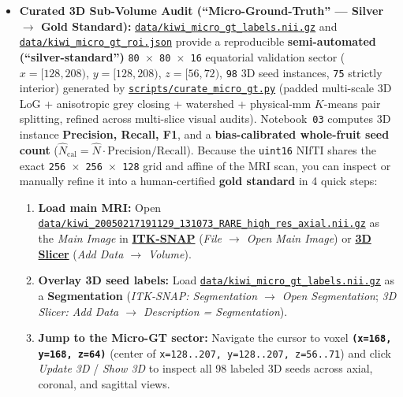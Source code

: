 \documentclass[10pt,a4paper]{article}
\newcommand{\ghblob}{https://github.com/arvidl/BMED365-2027/blob/main}
\begin{document}
\begin{itemize}
    \item \textbf{Curated 3D Sub-Volume Audit (``Micro-Ground-Truth'' --- Silver $\to$ Gold Standard):} \href{\ghblob/Lab4-Comp-Imag/Kiwi-challenge/data/kiwi_micro_gt_labels.nii.gz}{\nolinkurl{data/kiwi_micro_gt_labels.nii.gz}} and \href{\ghblob/Lab4-Comp-Imag/Kiwi-challenge/data/kiwi_micro_gt_roi.json}{\nolinkurl{data/kiwi_micro_gt_roi.json}} provide a reproducible \textbf{semi-automated (``silver-standard'')} \texttt{80 $\times$ 80 $\times$ 16} equatorial validation sector ($x=[128,208)$, $y=[128,208)$, $z=[56,72)$, \texttt{98} 3D seed instances, \texttt{75} strictly interior) generated by \href{\ghblob/Lab4-Comp-Imag/Kiwi-challenge/scripts/curate_micro_gt.py}{\nolinkurl{scripts/curate_micro_gt.py}} (padded multi-scale 3D LoG + anisotropic grey closing + watershed + physical-mm $K$-means pair splitting, refined across multi-slice visual audits). Notebook~\texttt{03} computes 3D instance \textbf{Precision, Recall, F1}, and a \textbf{bias-calibrated whole-fruit seed count} ($\hat{N}_{\text{cal}} = \hat{N} \cdot \text{Precision} / \text{Recall}$). Because the \texttt{uint16} NIfTI shares the exact \texttt{256 $\times$ 256 $\times$ 128} grid and affine of the MRI scan, you can inspect or manually refine it into a human-certified \textbf{gold standard} in 4 quick steps:
    \begin{enumerate}
        \item \textbf{Load main MRI:} Open \href{\ghblob/Lab4-Comp-Imag/Kiwi-challenge/data/kiwi_20050217191129_131073_RARE_high_res_axial.nii.gz}{\nolinkurl{data/kiwi_20050217191129_131073_RARE_high_res_axial.nii.gz}} as the \textit{Main Image} in \href{http://www.itksnap.org/}{\textbf{ITK-SNAP}} (\textit{File $\to$ Open Main Image}) or \href{https://www.slicer.org/}{\textbf{3D Slicer}} (\textit{Add Data $\to$ Volume}).
        \item \textbf{Overlay 3D seed labels:} Load \href{\ghblob/Lab4-Comp-Imag/Kiwi-challenge/data/kiwi_micro_gt_labels.nii.gz}{\nolinkurl{data/kiwi_micro_gt_labels.nii.gz}} as a \textbf{Segmentation} (\textit{ITK-SNAP: Segmentation $\to$ Open Segmentation}; \textit{3D Slicer: Add Data $\to$ Description = Segmentation}).
        \item \textbf{Jump to the Micro-GT sector:} Navigate the cursor to voxel \textbf{\texttt{(x=168, y=168, z=64)}} (center of \texttt{x=128..207, y=128..207, z=56..71}) and click \textit{Update 3D} / \textit{Show 3D} to inspect all 98 labeled 3D seeds across axial, coronal, and sagittal views.

\end{enumerate}
\end{itemize}
\end{document}
